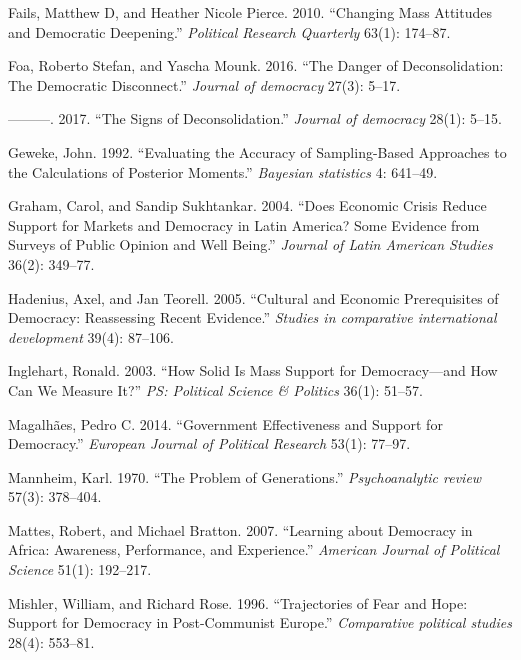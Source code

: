 \documentclass[12pt,english,a4paper,oneside]{article}
\newlength{\cslhangindent}
\newlength{\cslentryspacingunit} %
\newenvironment{CSLReferences}[2] %
 {%
  \setlength{\parindent}{0pt}
  \ifodd #1
  \let\oldpar\par
  \def\par{\hangindent=\cslhangindent\oldpar}
  \fi
  \setlength{\parskip}{#2\cslentryspacingunit}
 }%
 {}
\theoremstyle{definition}
\theoremstyle{definition}
\theoremstyle{definition}
\theoremstyle{definition}
\theoremstyle{remark}
\begin{document}
\begin{CSLReferences}{1}{0}
\leavevmode{}%
Fails, Matthew D, and Heather Nicole Pierce. 2010. {``Changing Mass Attitudes and Democratic Deepening.''} \emph{Political Research Quarterly} 63(1): 174--87.

\leavevmode{}%
Foa, Roberto Stefan, and Yascha Mounk. 2016. {``The Danger of Deconsolidation: The Democratic Disconnect.''} \emph{Journal of democracy} 27(3): 5--17.

\leavevmode{}%
---------. 2017. {``The Signs of Deconsolidation.''} \emph{Journal of democracy} 28(1): 5--15.

\leavevmode{}%
Geweke, John. 1992. {``Evaluating the Accuracy of Sampling-Based Approaches to the Calculations of Posterior Moments.''} \emph{Bayesian statistics} 4: 641--49.

\leavevmode{}%
Graham, Carol, and Sandip Sukhtankar. 2004. {``Does Economic Crisis Reduce Support for Markets and Democracy in Latin America? Some Evidence from Surveys of Public Opinion and Well Being.''} \emph{Journal of Latin American Studies} 36(2): 349--77.

\leavevmode{}%
Hadenius, Axel, and Jan Teorell. 2005. {``Cultural and Economic Prerequisites of Democracy: Reassessing Recent Evidence.''} \emph{Studies in comparative international development} 39(4): 87--106.

\leavevmode{}%
Inglehart, Ronald. 2003. {``How Solid Is Mass Support for Democracy---and How Can We Measure It?''} \emph{PS: Political Science \& Politics} 36(1): 51--57.

\leavevmode{}%
Magalhães, Pedro C. 2014. {``Government Effectiveness and Support for Democracy.''} \emph{European Journal of Political Research} 53(1): 77--97.

\leavevmode{}%
Mannheim, Karl. 1970. {``The Problem of Generations.''} \emph{Psychoanalytic review} 57(3): 378--404.

\leavevmode{}%
Mattes, Robert, and Michael Bratton. 2007. {``Learning about Democracy in Africa: Awareness, Performance, and Experience.''} \emph{American Journal of Political Science} 51(1): 192--217.

\leavevmode{}%
Mishler, William, and Richard Rose. 1996. {``Trajectories of Fear and Hope: Support for Democracy in Post-Communist Europe.''} \emph{Comparative political studies} 28(4): 553--81.


\end{CSLReferences}
\end{document}
